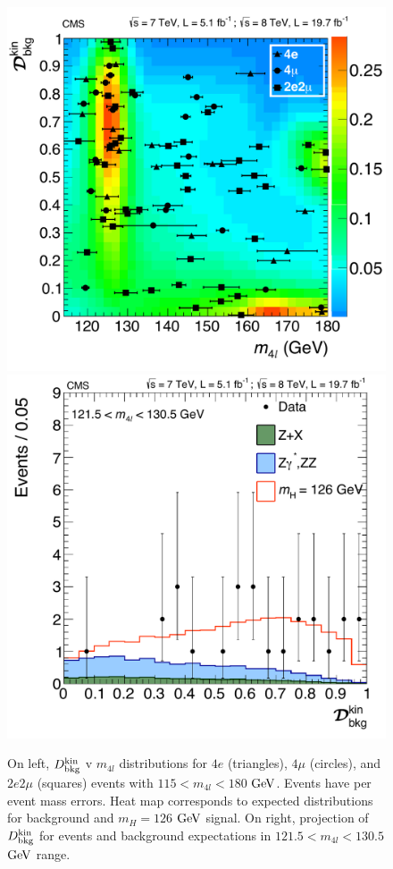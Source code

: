 \begin{figure}[htbp]
\begin{center}
\includegraphics[width=.45\linewidth]{HiggsDiscovery/figures/KD_vs_m4l_lowMass_Signal.pdf}
\includegraphics[width=.45\linewidth]{HiggsDiscovery/figures/KDPeak.pdf}
\caption[Observed $D_{\rm{bkg}}^{\rm{kin}}$ Distributions for Low Mass $4l$ Events With Signal Expectations]{On left, $D_{\rm{bkg}}^{\rm{kin}}$ v $m_{4l}$ distributions for $4e$ (triangles), $4\mu$ (circles), and $2e2\mu$ (squares) events with $115 < m_{4l} < 180$ $\rm{GeV}$. Events have per event mass errors. Heat map corresponds to expected distributions for background and $m_H = 126$ $\rm{GeV}$ signal. On right, projection of $D_{\rm{bkg}}^{\rm{kin}}$ for events and background expectations in $121.5 < m_{4l} < 130.5$ $\rm{GeV}$ range.}
\label{fig:Dbkg_2D_Results_Peak}
\end{center}
\end{figure}

